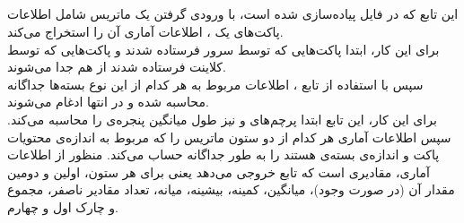 \subsection{}
این تابع که در فایل
پیاده‌سازی شده است، با ورودی گرفتن یک ماتریس شامل اطلاعات پاکت‌های یک ، اطلاعات آماری آن را استخراج می‌کند.\\
برای این کار، ابتدا پاکت‌هایی که توسط سرور فرستاده شدند و پاکت‌هایی که توسط کلاینت فرستاده شدند از هم جدا می‌شوند.\\
سپس با استفاده از تابع
،
اطلاعات مربوط به هر کدام از این نوع بسته‌ها جداگانه محاسبه شده و در انتها ادغام می‌شوند.\\
برای این کار، این تابع ابتدا پرچم‌های  و نیز طول میانگین پنجره‌ی  را محاسبه می‌کند. سپس اطلاعات آماری هر کدام از دو ستون‌ ماتریس را که مربوط به اندازه‌ی محتویات پاکت و اندازه‌ی بسته‌ی  هستند را به طور جداگانه حساب می‌کند. منظور از اطلاعات آماری، مقادیری است که تابع 
خروجی می‌دهد یعنی برای هر ستون، اولین و دومین مقدار آن (در صورت وجود)، میانگین، کمینه، بیشینه، میانه، تعداد مقادیر ناصفر، مجموع و چارک اول و چهارم.\\
